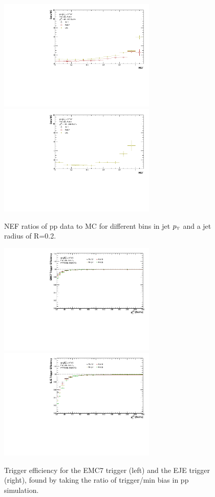 \documentclass[ALICE]{ALICE_analysis_notes}
\newcommand{\pT}{$p_{\mbox{\tiny T}}$\xspace}
\newcommand{\pp}{pp\xspace}
\begin{document}
\begin{figure}[h!]
\begin{multicols}{2}
            \includegraphics[width=7.5cm]{figures/TriggerBias/NEF/hNEF_ptBin3_R02.pdf}
            \includegraphics[width=7.5cm]{figures/TriggerBias/NEF/hNEF_ptBin5_R02.pdf}
        \vfill\null
    \end{multicols}
    \caption{NEF ratios of \pp data to MC for different bins in jet \pT and a jet radius of R=0.2.}
    \label{fig:TriggerBiasNEFR02}
\end{figure}

\begin{figure}[h!]
    \centering
    \begin{multicols}{2}
            \includegraphics[width=7.5cm]{figures/TriggerEfficiency/hEfficiency_EMC7.pdf}
        \vfill\null
        \columnbreak
            \includegraphics[width=7.5cm]{figures/TriggerEfficiency/hEfficiency_EJE.pdf}
        \vfill\null
    \end{multicols}
    \caption{Trigger efficiency for the EMC7 trigger (left) and the EJE trigger (right), found by taking the ratio of trigger/min bias in \pp simulation.}
    \label{fig:TriggerEfficiency}
\end{figure}
\end{document}
